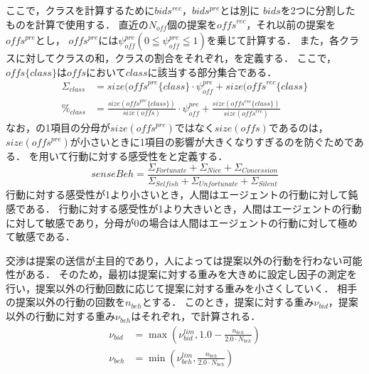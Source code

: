 ここで，クラスを計算するために$bids^{rec}$，$bids^{pre}$とは別に
$bids$を2つに分割したものを計算で使用する．
直近の$N_{\mathit{off}}$個の提案を$\mathit{offs}^{rec}$，それ以前の提案を$\mathit{offs}^{pre}$とし，
$\mathit{offs}^{pre}$には$\psi_{\mathit{off}}^{pre}(0 \leqq \psi_{\mathit{off}}^{pre} \leqq 1)$を乗じて計算する．
また，各クラスに対してクラスの和，クラスの割合をそれぞれ，を定義する．
ここで，$\mathit{offs}\{class\}$は$\mathit{offs}$において$class$に該当する部分集合である．
\begin{align}
    \Sigma_{class} &= size(\mathit{offs}^{pre}\{class\} \cdot \psi_{\mathit{off}}^{pre} + size(\mathit{offs}^{rec}\{class\} \label{eq:classSum} \\
    \%_{class} &= \frac{size(\mathit{offs}^{pre}\{class\})}{size(\mathit{offs})} \cdot \psi_{\mathit{off}}^{pre} + \frac{size(\mathit{offs^{rec}}\{class\})}{size(\mathit{offs}^{rec})} 
    \label{eq:classRate}
\end{align}
なお，の1項目の分母が$size(\mathit{offs}^{pre})$ではなく$size(\mathit{offs})$であるのは，
$size(\mathit{offs}^{pre})$が小さいときに1項目の影響が大きくなりすぎるのを防ぐためである．
を用いて行動に対する感受性をと定義する．
\begin{equation}
    senseBeh = \frac{\Sigma_{Fortunate} + \Sigma_{Nice} + \Sigma_{Concession}}{\Sigma_{\mathit{Selfish}} + \Sigma_{\mathit{Unfortunate}} + \Sigma_{Silent}} 
    \label{eq:sensebeh}
\end{equation}
行動に対する感受性が1より小さいとき，人間はエージェントの行動に対して鈍感である．
行動に対する感受性が1より大きいとき，人間はエージェントの行動に対して敏感であり，分母が0の場合は人間はエージェントの行動に対して極めて敏感である．

交渉は提案の送信が主目的であり，人によっては提案以外の行動を行わない可能性がある．
そのため，最初は提案に対する重みを大きめに設定し因子の測定を行い，提案以外の行動回数に応じて提案に対する重みを小さくしていく．
相手の提案以外の行動の回数を$n_{beh}$とする．
このとき，提案に対する重み$\nu_{\mathit{bid}}$，提案以外の行動に対する重み$\nu_{beh}$はそれぞれ，で計算される．
\begin{align}
    \nu_{\mathit{bid}} &= \max \left( \nu_{\mathit{bid}}^{lim}, 1.0 - \frac{n_{beh}}{2.0 \cdot N_{beh}} \right) \label{eq:offW} \\
    \nu_{beh} &= \min \left( \nu_{beh}^{lim}, \frac{n_{beh}}{2.0 \cdot N_{beh}} \right) \label{eq:behW} 
\end{align}


